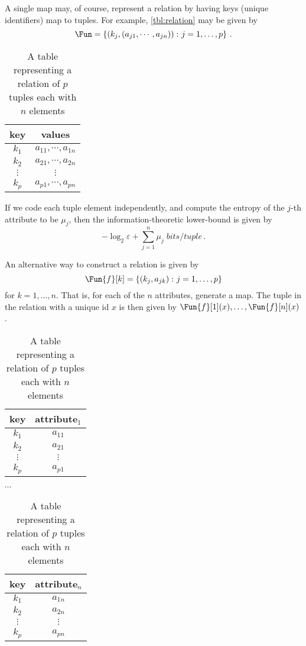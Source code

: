 \documentclass[ ../main.tex]{subfiles}
\begin{document}
A single map may, of course, represent a relation by having keys (unique identifiers) map to tuples. For example, \cref{tbl:relation} may be given by
\begin{equation}
    \Fun = \left\{
        \left(k_j, \left(a_{j 1}, \cdots, a_{j n}\right)\right) \colon j = 1,\ldots,p
    \right\}\,.
\end{equation}

\begin{table}[h]
\centering
\caption{A table representing a relation of $p$ tuples each with $n$ elements}
\label{tbl:relation_tuple_value}
\begin{tabular}{|c c|} 
\hline
key & values\\
\hline
    $k_1$ & $a_{1 1},\cdots,a_{1 n}$\\
    $k_2$ & $a_{2 1},\cdots,a_{2 n}$\\
    $\vdots$ & $\vdots$\\
    $k_p$ & $a_{p 1},\cdots,a_{p n}$\\
\hline
\end{tabular}
\end{table}

If we code each tuple element independently, and compute the entropy of the $j$-th attribute to be $\mu_j$, then the information-theoretic lower-bound is given by
\begin{equation}
    -\log_2 \varepsilon + \sum_{j=1}^{n} \mu_j \; \si{bits \per tuple}\,.
\end{equation}

An alternative way to construct a relation is given by
\begin{equation}
    \Fun{f}[k] =
    \left\{
        \left(k_j, a_{j k}\right) \colon j = 1,\ldots,p
    \right\}
\end{equation}
for $k=1,\ldots,n$. That is, for each of the $n$ attributes, generate a map.
The tuple in the relation with a unique id $x$ is then given by $\Fun{f}[1](x),\ldots,\Fun{f}[n](x)$.

\begin{table}[h]
\centering
\caption{A table representing a relation of $p$ tuples each with $n$ elements}
\label{tbl:relation2}
\begin{tabular}{|c c|} 
\hline
key & attribute$_1$\\
\hline
    $k_1$ & $a_{1 1}$\\
    $k_2$ & $a_{2 1}$\\
    $\vdots$ & $\vdots$\\
    $k_p$ & $a_{p 1}$\\
\hline
\end{tabular}
$\cdots$
\begin{tabular}{|c c|} 
\hline
key & attribute$_n$\\
\hline
    $k_1$ & $a_{1 n}$\\
    $k_2$ & $a_{2 n}$\\
    $\vdots$ & $\vdots$\\
    $k_p$ & $a_{p n}$\\
\hline
\end{tabular}
\end{table}
\end{document}

